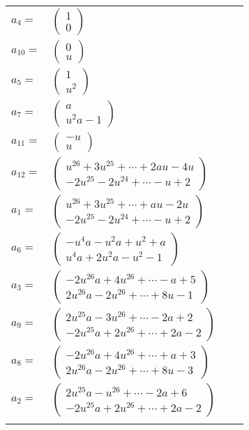 \documentclass[1p]{elsarticle_modified}
\theoremstyle{definition}
\begin{document}
\begin{tabular}{m{7pt} m{180pt} m{7pt} m{180pt} }
\flushright $a_{4}=$&$\begin{pmatrix}1\\0\end{pmatrix}$ \\
\flushright $a_{10}=$&$\begin{pmatrix}0\\u\end{pmatrix}$ \\
\flushright $a_{5}=$&$\begin{pmatrix}1\\u^2\end{pmatrix}$ \\
\flushright $a_{7}=$&$\begin{pmatrix}a\\u^2 a-1\end{pmatrix}$ \\
\flushright $a_{11}=$&$\begin{pmatrix}- u\\u\end{pmatrix}$ \\
\flushright $a_{12}=$&$\begin{pmatrix}u^{26}+3 u^{25}+\cdots+2 a u-4 u\\-2 u^{25}-2 u^{24}+\cdots- u+2\end{pmatrix}$ \\
\flushright $a_{1}=$&$\begin{pmatrix}u^{26}+3 u^{25}+\cdots+a u-2 u\\-2 u^{25}-2 u^{24}+\cdots- u+2\end{pmatrix}$ \\
\flushright $a_{6}=$&$\begin{pmatrix}- u^4 a- u^2 a+u^2+a\\u^4 a+2 u^2 a- u^2-1\end{pmatrix}$ \\
\flushright $a_{3}=$&$\begin{pmatrix}-2 u^{26} a+4 u^{26}+\cdots- a+5\\2 u^{26} a-2 u^{26}+\cdots+8 u-1\end{pmatrix}$ \\
\flushright $a_{9}=$&$\begin{pmatrix}2 u^{25} a-3 u^{26}+\cdots-2 a+2\\-2 u^{25} a+2 u^{26}+\cdots+2 a-2\end{pmatrix}$ \\
\flushright $a_{8}=$&$\begin{pmatrix}-2 u^{26} a+4 u^{26}+\cdots+a+3\\2 u^{26} a-2 u^{26}+\cdots+8 u-3\end{pmatrix}$ \\
\flushright $a_{2}=$&$\begin{pmatrix}2 u^{25} a- u^{26}+\cdots-2 a+6\\-2 u^{25} a+2 u^{26}+\cdots+2 a-2\end{pmatrix}$\\&\end{tabular}
\end{document}
